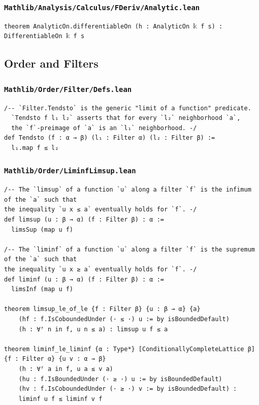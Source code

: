 \subsubsection{\texttt{Mathlib/Analysis/Calculus/FDeriv/Analytic.lean}}
\begin{lstlisting}[language=lean]
theorem AnalyticOn.differentiableOn (h : AnalyticOn 𝕜 f s) : DifferentiableOn 𝕜 f s
\end{lstlisting}

\newpage

\subsection{Order and Filters}

\subsubsection{\texttt{Mathlib/Order/Filter/Defs.lean}}
\begin{lstlisting}[language=lean]
/-- `Filter.Tendsto` is the generic "limit of a function" predicate.
  `Tendsto f l₁ l₂` asserts that for every `l₂` neighborhood `a`,
  the `f`-preimage of `a` is an `l₁` neighborhood. -/
def Tendsto (f : α → β) (l₁ : Filter α) (l₂ : Filter β) :=
  l₁.map f ≤ l₂
\end{lstlisting}

\subsubsection{\texttt{Mathlib/Order/LiminfLimsup.lean}}
\begin{lstlisting}[language=lean]
/-- The `limsup` of a function `u` along a filter `f` is the infimum of the `a` such that
the inequality `u x ≤ a` eventually holds for `f`. -/
def limsup (u : β → α) (f : Filter β) : α :=
  limsSup (map u f)

/-- The `liminf` of a function `u` along a filter `f` is the supremum of the `a` such that
the inequality `u x ≥ a` eventually holds for `f`. -/
def liminf (u : β → α) (f : Filter β) : α :=
  limsInf (map u f)

theorem limsup_le_of_le {f : Filter β} {u : β → α} {a}
    (hf : f.IsCoboundedUnder (· ≤ ·) u := by isBoundedDefault)
    (h : ∀ᶠ n in f, u n ≤ a) : limsup u f ≤ a

theorem liminf_le_liminf {α : Type*} [ConditionallyCompleteLattice β] {f : Filter α} {u v : α → β}
    (h : ∀ᶠ a in f, u a ≤ v a)
    (hu : f.IsBoundedUnder (· ≥ ·) u := by isBoundedDefault)
    (hv : f.IsCoboundedUnder (· ≥ ·) v := by isBoundedDefault) :
    liminf u f ≤ liminf v f
\end{lstlisting}

